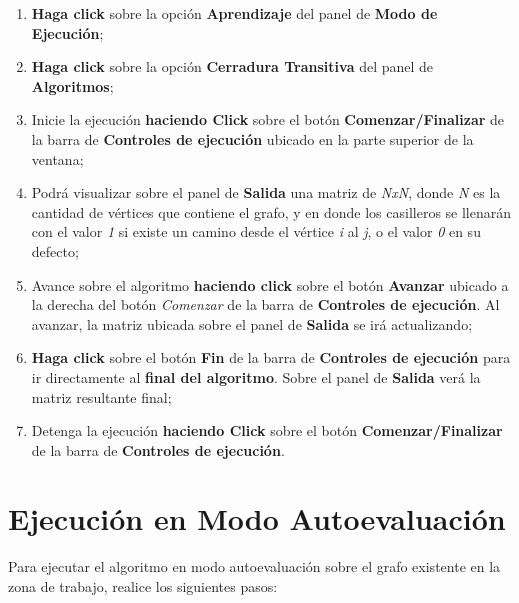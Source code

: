 \documentclass{book}
\begin{document}
\begin{enumerate}
	\itemsep=8pt \topsep=0pt \partopsep=0pt \parskip=0pt \parsep=0pt

	\item \textbf{Haga click} sobre la opción \textbf{Aprendizaje} del panel de \textbf{Modo de Ejecución};

	\item \textbf{Haga click} sobre la opción \textbf{Cerradura Transitiva} del panel de \textbf{Algoritmos};

	\item Inicie la ejecución \textbf{haciendo Click} sobre el botón \textbf{Comenzar/Finalizar} de la barra de \textbf{Controles de ejecución} ubicado en la parte superior de la ventana;

	\item Podrá visualizar sobre el panel de \textbf{Salida} una matriz de \textit{NxN}, donde \textit{N} es la cantidad de vértices que contiene el grafo, y en donde los casilleros se llenarán con el valor \textit{1} si existe un camino desde el vértice \textit{i} al \textit{j}, o el valor \textit{0} en su defecto; 

	\item Avance sobre el algoritmo \textbf{haciendo click} sobre el botón \textbf{Avanzar} ubicado a la derecha del botón \textit{Comenzar} de la barra de \textbf{Controles de ejecución}. Al avanzar, la matriz ubicada sobre el panel de \textbf{Salida} se irá actualizando;

	\item \textbf{Haga click} sobre el botón \textbf{Fin} de la barra de \textbf{Controles de ejecución} para ir directamente al \textbf{final del algoritmo}. Sobre el panel de \textbf{Salida} verá la matriz resultante final;

	\item Detenga la ejecución \textbf{haciendo Click} sobre el botón \textbf{Comenzar/Finalizar} de la barra de \textbf{Controles de ejecución}.

\end{enumerate}
\medskip



\section{Ejecución en Modo Autoevaluación}

Para ejecutar el algoritmo en modo autoevaluación sobre el grafo existente en la zona de trabajo, realice los siguientes pasos:
\medskip
\end{document}
